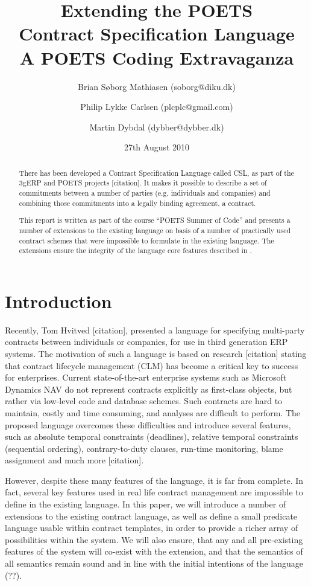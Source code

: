 \documentclass[10pt,a4paper,final,oneside,openany,article]{memoir}
\title{Extending the POETS \\ Contract Specification Language\\
       \vspace{0.1cm}
        \small{A POETS Coding Extravaganza}}
\author{Brian Søborg Mathiasen (soborg@diku.dk) \and
        Philip Lykke Carlsen (plcplc@gmail.com) \and
        Martin Dybdal (dybber@dybber.dk)}
\date{27th August 2010}
\begin{document}
\maketitle

\begin{abstract}
  There has been developed a Contract Specification Language called
  CSL, as part of the 3gERP and POETS projects [citation]. It makes it
  possible to describe a set of commitments between a number of
  parties (e.g. individuals and companies) and combining those
  commitments into a legally binding agreement, a contract.

  This report is written as part of the course "`POETS Summer of
  Code"' and presents a number of extensions to the existing
  language on basis of a number of practically used contract schemes
  that were impossible to formulate in the existing language. The
  extensions ensure the integrity of the language core features
  described in \cite{hvitved10}.
\end{abstract}


\newpage
\chapter{Introduction}
Recently, Tom Hvitved [citation], presented a language for specifying
multi-party contracts between individuals or companies, for use in third
generation ERP systems. The motivation of such a language is based on research
[citation] stating that contract lifecycle management (CLM) has become a
critical key to success for enterprises. Current state-of-the-art enterprise
systems such as Microsoft Dynamics NAV do not represent contracts explicitly as
first-class objects, but rather via low-level code and database schemes. Such
contracts are hard to maintain, costly and time consuming, and analyses are
difficult to perform. The proposed language overcomes these difficulties and
introduce several features, such as absolute temporal constraints (deadlines),
relative temporal constraints (sequential ordering), contrary-to-duty clauses,
run-time monitoring, blame assignment and much more [citation].

However, despite these many features of the language, it is far from complete.
In fact, several key features used in real life contract management are
impossible to define in the existing language. In this paper, we will introduce
a number of extensions to the existing contract language, as well as define a
small predicate language usable within contract templates, in order to provide a
richer array of possibilities within the system. We will also ensure, that any
and all pre-existing features of the system will co-exist with the extension,
and that the semantics of all semantics remain sound and in line with the
initial intentions of the language (??).
\end{document}
